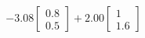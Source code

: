 \documentclass[preview]{standalone}
\begin{document}
\begin{align*}
-3.08 \begin{bmatrix} 0.8 \\ 0.5 \end{bmatrix} + 2.00 \begin{bmatrix} 1 \\ 1.6 \end{bmatrix}
\end{align*}
\end{document}
